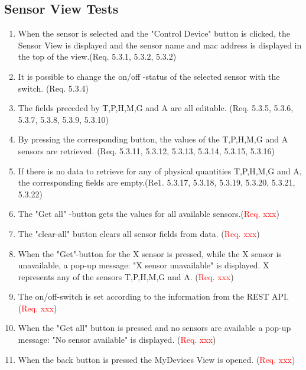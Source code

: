 \documentclass[a4paper]{article}
\newlength{\testlabellength}
\newenvironment{testlist}{\begin{enumerate}[label=\bfseries Test \thesubsection.\arabic* , labelindent=0pt, labelwidth=\testlabellength , leftmargin=2cm]}{\end{enumerate}}
\begin{document}
\begin{appendices}
\subsection{Sensor View Tests}
\begin{testlist}
\item When the sensor is selected and the "Control Device" button is clicked, the Sensor View is displayed and the sensor name and mac address is displayed in the top of the view.(Req. 5.3.1, 5.3.2, 5.3.2) 
\item It is possible to change the on/off -status of the selected sensor with the switch. (Req. 5.3.4)
\item The fields preceded by T,P,H,M,G and A are all editable. (Req. 5.3.5, 5.3.6, 5.3.7, 5.3.8, 5.3.9, 5.3.10)
\item By pressing the corresponding button, the values of the T,P,H,M,G and A sensors are retrieved. (Req. 5.3.11, 5.3.12, 5.3.13, 5.3.14, 5.3.15, 5.3.16)
\item If there is no data to retrieve for any of physical quantities T,P,H,M,G and A, the corresponding fields are empty.(Re1. 5.3.17, 5.3.18, 5.3.19, 5.3.20, 5.3.21, 5.3.22)
\item The "Get all" -button gets the values for all available sensors.(\textcolor{red}{Req. xxx})
\item The "clear-all" button clears all sensor fields from data. (\textcolor{red}{Req. xxx})
\item When the "Get"-button for the X sensor is pressed, while the X sensor is unavailable, a pop-up message: "X sensor unavailable" is displayed. X represents any of the sensors T,P,H,M,G and A. (\textcolor{red}{Req. xxx})
\item The on/off-switch is set according to the information from the REST API. (\textcolor{red}{Req. xxx})
\item When the "Get all" button is pressed and no sensors are available a pop-up message: "No sensor available" is displayed. (\textcolor{red}{Req. xxx})
\item When the back button is pressed the MyDevices View is opened. (\textcolor{red}{Req. xxx})

\end{testlist}

%
%



\end{appendices}
\end{document}

